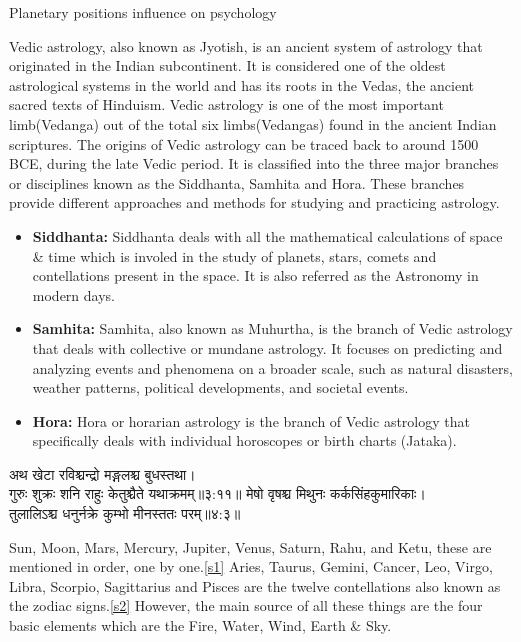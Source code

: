 Planetary positions influence on psychology

Vedic astrology, also known as Jyotish, is an ancient system of astrology that originated in the Indian subcontinent. It is considered one of the oldest astrological systems in the world and has its roots in the Vedas, the ancient sacred texts of Hinduism.
Vedic astrology is one of the most important limb(Vedanga) out of the total six limbs(Vedangas) found in the ancient Indian scriptures. The origins of Vedic astrology can be traced back to around 1500 BCE, during the late Vedic period. It is classified into the three major branches or disciplines known as the Siddhanta, Samhita and Hora. These branches provide different approaches and methods for studying and practicing astrology.
\begin{itemize}
	\item \textbf{Siddhanta:} Siddhanta deals with all the mathematical calculations of space \& time which is involed in the study of planets, stars, comets and contellations present in the space. It is also referred as the Astronomy in modern days.
	\item \textbf{Samhita:} Samhita, also known as Muhurtha, is the branch of Vedic astrology that deals with collective or mundane astrology. It focuses on predicting and analyzing events and phenomena on a broader scale, such as natural disasters, weather patterns, political developments, and societal events.
	\item \textbf{Hora:} Hora or horarian astrology is the branch of Vedic astrology that specifically deals with individual horoscopes or birth charts (Jataka).
\end{itemize}

\begin{sanskrit}
	\begin{center}
		अथ खेटा रविश्चन्द्रो मङ्गलश्च बुधस्तथा।\\गुरुः शुक्रः शनि राहुः केतुश्चैते यथाक्रमम्‌॥३:११॥\cite{BrihatParasharHoraShastraVol1}\cite{wiki:bphs}\label{s1}
		मेषो वृषश्च मिथुनः कर्कसिंहकुमारिकाः।\\तुलालिऽश्च धनुर्नक्रे कुम्भो मीनस्ततः परम्‌॥४:३॥\cite{BrihatParasharHoraShastraVol1}\cite{wiki:bphs}\label{s2}
	\end{center}
\end{sanskrit}
Sun, Moon, Mars, Mercury, Jupiter, Venus, Saturn, Rahu, and Ketu, these are mentioned in order, one by one.\ref{s1}
Aries, Taurus, Gemini, Cancer, Leo, Virgo, Libra, Scorpio, Sagittarius and Pisces are the twelve contellations also known as the zodiac signs.\ref{s2}
However, the main source of all these things are the four basic elements which are the Fire, Water, Wind, Earth \& Sky.

